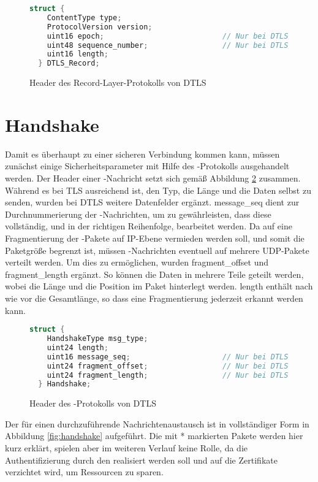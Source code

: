 \begin{figure}[ht]
  \centering
  \begin{lstlisting}[language=c]
  struct {
    ContentType type;
    ProtocolVersion version;
    uint16 epoch;                           // Nur bei DTLS
    uint48 sequence_number;                 // Nur bei DTLS
    uint16 length;
  } DTLS_Record;
  \end{lstlisting}
  \caption{Header des Record-Layer-Protokolls von DTLS}
  \label{fig:recordlayer}
\end{figure}

\section{Handshake}

Damit es überhaupt zu einer sicheren Verbindung kommen kann, müssen zunächst einige Sicherheitsparameter mit Hilfe des -Protokolls ausgehandelt werden.
Der Header einer -Nachricht setzt sich gemäß Abbildung \ref{fig:handshakelayer} zusammen. Während es bei TLS ausreichend ist, den Typ, die Länge und die Daten selbst
zu senden, wurden bei DTLS weitere Datenfelder ergänzt. message\_seq dient zur Durchnummerierung der -Nachrichten, um zu gewährleisten, dass diese vollständig,
und in der richtigen Reihenfolge, bearbeitet werden. Da auf eine Fragmentierung der -Pakete auf IP-Ebene vermieden werden soll, und somit die Paketgröße begrenzt ist,
müssen -Nachrichten eventuell auf mehrere UDP-Pakete verteilt werden. Um dies zu ermöglichen, wurden fragment\_offset und fragment\_length
ergänzt. So können die Daten in mehrere Teile geteilt werden, wobei die Länge und die Position im Paket hinterlegt werden. length enthält nach wie vor die
Gesamtlänge, so dass eine Fragmentierung jederzeit erkannt werden kann.

\begin{figure}[ht]
  \centering
  \begin{lstlisting}[language=c]
  struct {
    HandshakeType msg_type;
    uint24 length;
    uint16 message_seq;                     // Nur bei DTLS
    uint24 fragment_offset;                 // Nur bei DTLS
    uint24 fragment_length;                 // Nur bei DTLS
  } Handshake;
  \end{lstlisting}
  \caption{Header des -Protokolls von DTLS}
  \label{fig:handshakelayer}
\end{figure}

Der für einen  durchzuführende Nachrichtenaustausch ist in vollständiger Form in Abbildung \ref{fig:handshake} aufgeführt.
Die mit * markierten Pakete werden hier kurz erklärt, spielen aber im weiteren Verlauf keine Rolle, da die Authentifizierung durch
den  realisiert werden soll und auf die Zertifikate verzichtet wird, um Ressourcen zu sparen.

